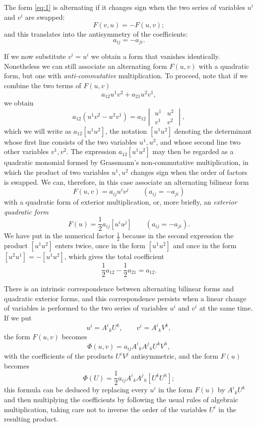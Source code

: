 \documentclass[leqno,11pt]{book}
\numberwithin{equation}{chapter}
\theoremstyle{shape1}
\theoremstyle{shape0}
\theoremstyle{shape2}
\theoremstyle{definition}
\begin{document}
\vspace{12pt}\fsec The form \eqref{eq:1} is  alternating  if it changes sign when the two series of variables $u^{i}$ and $v^{i}$ are swapped:
\[
F(v,u)=-F(u,v);
\]
and this translates into the antisymmetry of the coefficients:
\[
a_{ij}=-a_{ji}.
\]

If we now substitute $v^{i}=u^{i}$ we obtain a form that vanishes identically. Nonetheless we can still associate  an alternating form $F(u,v)$ with a quadratic form,  but one with \emph{anti-commutative} multiplication. To proceed, note that if we combine the two terms of $F(u,v)$
\[
a_{12}u^{1}v^{2}+a_{21}u^{2}v^{1},
\]
we obtain
\[
a_{12}(u^{1}v^{2}-u^{2}v^{1})=a_{12}
\begin{vmatrix}
  u^{1}&u^{2}\\
  v^{1}&v^{2}
\end{vmatrix}
,
\]
which we will write as $a_{12}[u^{1}u^{2}]$, the notation $[u^{1}u^{2}]$ denoting the determinant whose first line consists of the two variables $u^{1}, u^{2}$, and whose second line two other variables $v^{1}, v^{2}$. The expression $a_{12}[u^{1}u^{2}]$ may then  be regarded as a quadratic monomial formed by Grassmann's non-commutative multiplication, in which the product of two variables $u^{1}, u^{2}$ changes sign when the order of factors is swapped. We can, therefore, in this case associate  an alternating bilinear form
\[
F(u,v)=a_{ij}u^{i}v^{j}\qquad(a_{ij}=-a_{ji})
\]
with a quadratic form of exterior multiplication, or, more briefly, an \emph{exterior quadratic form} 
\[
F(u)=\frac{1}{2}a_{ij}[u^{i}u^{j}]\qquad(a_{ij}=-a_{ji}).
\]
We have put in the numerical factor $\frac{1}{2}$ because in the second expression the product $[u^{1}u^{2}]$ enters twice, once in the form $[u^{1}u^{2}]$ and once in the form $[u^{2}u^{1}]=-[u^{1}u^{2}]$, which gives the total coefficient
\[
\frac{1}{2}a_{12}-\frac{1}{2}a_{21}=a_{12}.
\]

There is an intrinsic correspondence between alternating bilinear forms and quadratic exterior forms, and this correspondence persists when a linear change of variables is performed  to the two series of variables $u^{i}$ and $v^{i}$ at the same time. If we put
\[
u^{i}=A^{i}{}_{k}U^{k},\qquad v^{i}=A^{i}{}_{k}V^{k},
\]
the form $F(u,v)$ becomes
\[
\Phi(u,v)=a_{ij}A^{i}{}_{k}A^{j}{}_{h}U^{k}V^{h},
\]
with the coefficients of the products $U^{i}V^{j}$ antisymmetric, and the form $F(u)$ becomes
\[
\Phi(U)=\frac{1}{2}a_{ij}A^{i}{}_{k}A^{j}{}_{h}[U^{k}U^{h}];
\]
this formula can be deduced by replacing every $u^{i}$ in the form $F(u)$ by $A^{i}{}_{k}U^{k}$ and then multiplying the coefficients by following the usual rules of algebraic multiplication,  taking care not to inverse the order of the variables $U^{i}$ in the resulting product.
\end{document}
